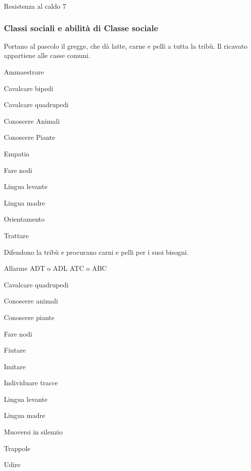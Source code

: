 \begin{abilist}
\item Resistenza al caldo 7
\end{abilist}

\subsubsection{Classi sociali e abilit\`a di Classe sociale}


Portano al pascolo il gregge, che d\`a latte, carne e pelli a tutta la
trib\`u.  Il ricavato appartiene alle casse comuni.

\begin{abilist}
\item Ammaestrare 
\item Cavalcare bipedi 
\item Cavalcare quadrupedi 
\item Conoscere Animali 
\item Conoscere Piante 
\item Empatia 
\item Fare nodi 
\item Lingua levante 
\item Lingua madre 
\item Orientamento 
\item Trattare 
\end{abilist}


Difendono la trib\`u e procurano carni e pelli per i suoi bisogni.

\begin{abilist}
\item Allarme ADT o ADL ATC o ABC 
\item Cavalcare quadrupedi 
\item Conoscere animali 
\item Conoscere piante 
\item Fare nodi 
\item Fiutare 
\item Imitare 
\item Individuare tracce 
\item Lingua levante 
\item Lingua madre 
\item Muoversi in silenzio 
\item Trappole 
\item Udire 
\end{abilist}

